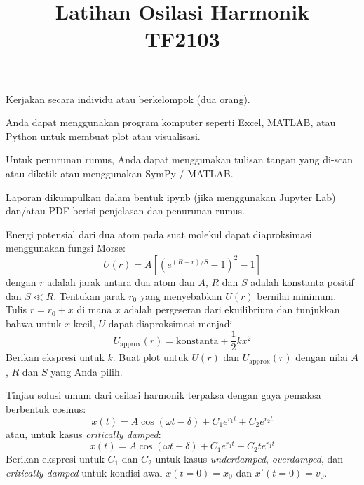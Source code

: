 



\title{Latihan Osilasi Harmonik \\
TF2103}
\author{}
\date{}
\maketitle

Kerjakan secara individu atau berkelompok (dua orang).

Anda dapat menggunakan program komputer seperti Excel, MATLAB, atau Python
untuk membuat plot atau visualisasi.

Untuk penurunan rumus, Anda dapat menggunakan tulisan tangan yang di-scan atau
diketik atau menggunakan SymPy / MATLAB.

Laporan dikumpulkan dalam bentuk ipynb (jika menggunakan Jupyter Lab) dan/atau PDF berisi
penjelasan dan penurunan rumus.

\begin{soal}
Energi potensial dari dua atom pada suat molekul dapat diaproksimasi menggunakan
fungsi Morse:
\begin{equation}
U(r) = A \left[ \left( e^{(R-r)/S} - 1 \right)^2 - 1  \right]
\end{equation}
dengan $r$ adalah jarak antara dua atom dan $A$, $R$ dan $S$ adalah konstanta positif
dan $S \ll R$.
Tentukan jarak $r_0$ yang menyebabkan $U(r)$ bernilai minimum.
Tulis $r = r_0 + x$ di mana $x$ adalah pergeseran dari ekuilibrium dan tunjukkan bahwa untuk
$x$ kecil, $U$ dapat diaproksimasi menjadi
\begin{equation}
U_{\mathrm{approx}}(r) = \text{konstanta} + \frac{1}{2}kx^2
\end{equation}
Berikan ekspresi untuk $k$.
Buat plot untuk $U(r)$ dan $U_{\mathrm{approx}}(r)$ dengan nilai $A$, $R$ dan $S$ yang Anda pilih.
\end{soal}


\begin{soal}
Tinjau solusi umum dari osilasi harmonik terpaksa dengan gaya pemaksa berbentuk
cosinus:
\begin{equation}
x(t) = A\cos(\omega t - \delta) + C_{1}e^{r_{1}t} + C_{2}e^{r_{2}t}
\end{equation}
atau, untuk kasus \textit{critically damped}:
\begin{equation}
x(t) = A\cos(\omega t - \delta) + C_{1}e^{r_{1}t} + C_{2} t e^{r_{1}t}
\end{equation}
Berikan ekspresi untuk $C_1$ dan $C_2$ untuk kasus \textit{underdamped},
\textit{overdamped}, dan \textit{critically-damped} untuk kondisi awal
$x(t=0) = x_0$ dan $x'(t=0) = v_0$.
\end{soal}



